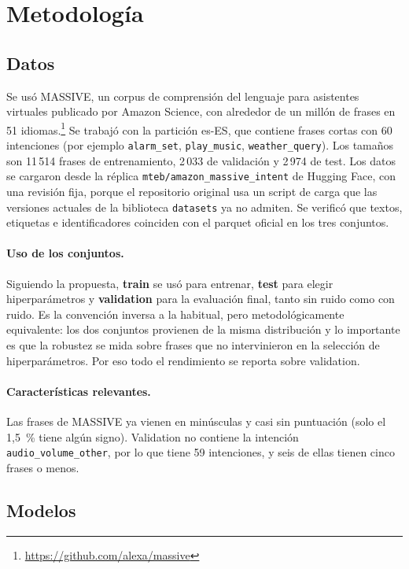 \documentclass[11pt,a4paper]{article}
\newcommand{\cod}[1]{\texttt{#1}}
\begin{document}
\section{Metodología}

\subsection{Datos}

Se usó MASSIVE, un corpus de comprensión del lenguaje para asistentes virtuales publicado por
Amazon Science, con alrededor de un millón de frases en 51 idiomas.\footnote{\url{https://github.com/alexa/massive}}
Se trabajó con la partición es-ES, que contiene frases cortas con 60 intenciones (por ejemplo
\cod{alarm\_set}, \cod{play\_music}, \cod{weather\_query}). Los tamaños son 11\,514 frases de entrenamiento, 2\,033 de validación
y 2\,974 de test. Los datos se cargaron desde la réplica \cod{mteb/amazon\_massive\_intent} de
Hugging Face, con una revisión fija, porque el repositorio original usa un script de carga que
las versiones actuales de la biblioteca \cod{datasets} ya no admiten. Se verificó que textos,
etiquetas e identificadores coinciden con el parquet oficial en los tres conjuntos.

\paragraph{Uso de los conjuntos.} Siguiendo la propuesta, \textbf{train} se usó para entrenar,
\textbf{test} para elegir hiperparámetros y \textbf{validation} para la evaluación final, tanto
sin ruido como con ruido. Es la convención inversa a la habitual, pero metodológicamente
equivalente: los dos conjuntos provienen de la misma distribución y lo importante es que la
robustez se mida sobre frases que no intervinieron en la selección de hiperparámetros. Por eso
todo el rendimiento se reporta sobre validation.

\paragraph{Características relevantes.} Las frases de MASSIVE ya vienen en minúsculas y casi
sin puntuación (solo el 1,5~\% tiene algún signo). Validation no contiene la intención
\cod{audio\_volume\_other}, por lo que tiene 59 intenciones, y seis de ellas tienen cinco frases
o menos.

\subsection{Modelos}
\label{sec:modelos}
\end{document}
